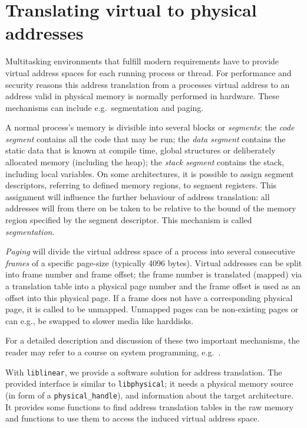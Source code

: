 %
%

\section{Translating virtual to physical addresses}

\label{addresstranslations} 
\label{address_translation} 

Multitasking environments that fulfill modern requirements have to provide
virtual address spaces for each running process or thread. For performance and
security reasons this address translation from a processes virtual address to an
address valid in physical memory is normally performed in hardware.  These
mechanisms can include e.g.~segmentation and paging.

A normal process's memory is divisible into several blocks or \emph{segments}:
the \emph{code segment} contains all the code that may be run; the \emph{data
segment} contains the static data that is known at compile time, global
structures or deliberately allocated memory (including the heap); the
\emph{stack segment} contains the stack, including local variables.  On some
architectures, it is possible to assign segment descriptors, referring to
defined memory regions, to segment registers.  This assignment will influence
the further behaviour of address translation: all addresses will from there on
be taken to be relative to the bound of the memory region specified by the
segment descriptor. This mechanism is called \emph{segmentation}.

\emph{Paging} will divide the virtual address space of a process into several
consecutive \emph{frames} of a specific page-size (typically 4096 bytes).
Virtual addresses can be split into frame number and frame offset; the frame
number is translated (mapped) via a translation table into a physical page
number and the frame offset is used as an offset into this physical page. If a
frame does not have a corresponding physical page, it is called to be unmapped.
Unmapped pages can be non-existing pages or can e.g., be swapped to slower media
like harddisks.

For a detailed description and discussion of these two important mechanisms, the
reader may refer to a course on system programming,
e.g.~\cite{rwth_syspro_scriptum:2002}.

With \texttt{liblinear}, we provide a software solution for address translation.
The provided interface is similar to \texttt{libphysical}; it needs a physical
memory source (in form of a \texttt{physical\_handle}), and information about
the target architecture. It provides some functions to find address translation
tables in the raw memory and functions to use them to access the induced virtual
address space.

